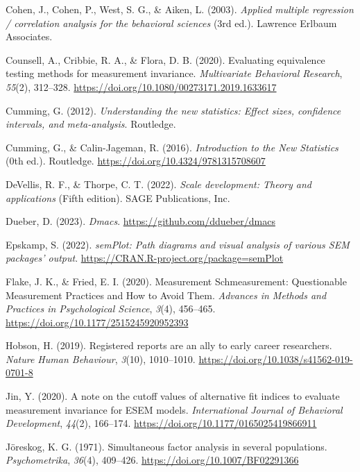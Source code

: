 \documentclass[
  man,floatsintext]{apa7}
\newlength{\cslhangindent}
\newenvironment{CSLReferences}[2] %
 {\begin{list}{}{%
  \setlength{\itemindent}{0pt}
  \setlength{\leftmargin}{0pt}
  \setlength{\parsep}{0pt}
  \ifodd #1
   \setlength{\leftmargin}{\cslhangindent}
   \setlength{\itemindent}{-1\cslhangindent}
  \fi
  \setlength{\itemsep}{#2\baselineskip}}}
 {\end{list}}
\begin{document}
\begin{CSLReferences}{1}{0}
Cohen, J., Cohen, P., West, S. G., \& Aiken, L. (2003). \emph{Applied multiple regression / correlation analysis for the behavioral sciences} (3rd ed.). Lawrence Erlbaum Associates.

Counsell, A., Cribbie, R. A., \& Flora, D. B. (2020). Evaluating equivalence testing methods for measurement invariance. \emph{Multivariate Behavioral Research}, \emph{55}(2), 312--328. \url{https://doi.org/10.1080/00273171.2019.1633617}

Cumming, G. (2012). \emph{Understanding the new statistics: Effect sizes, confidence intervals, and meta-analysis}. Routledge.

Cumming, G., \& Calin-Jageman, R. (2016). \emph{Introduction to the New Statistics} (0th ed.). Routledge. \url{https://doi.org/10.4324/9781315708607}

DeVellis, R. F., \& Thorpe, C. T. (2022). \emph{Scale development: Theory and applications} (Fifth edition). SAGE Publications, Inc.

Dueber, D. (2023). \emph{Dmacs}. \url{https://github.com/ddueber/dmacs}

Epskamp, S. (2022). \emph{semPlot: Path diagrams and visual analysis of various SEM packages' output}. \url{https://CRAN.R-project.org/package=semPlot}

Flake, J. K., \& Fried, E. I. (2020). Measurement Schmeasurement: Questionable Measurement Practices and How to Avoid Them. \emph{Advances in Methods and Practices in Psychological Science}, \emph{3}(4), 456--465. \url{https://doi.org/10.1177/2515245920952393}

Hobson, H. (2019). Registered reports are an ally to early career researchers. \emph{Nature Human Behaviour}, \emph{3}(10), 1010--1010. \url{https://doi.org/10.1038/s41562-019-0701-8}

Jin, Y. (2020). A note on the cutoff values of alternative fit indices to evaluate measurement invariance for ESEM models. \emph{International Journal of Behavioral Development}, \emph{44}(2), 166--174. \url{https://doi.org/10.1177/0165025419866911}

Jöreskog, K. G. (1971). Simultaneous factor analysis in several populations. \emph{Psychometrika}, \emph{36}(4), 409--426. \url{https://doi.org/10.1007/BF02291366}


\end{CSLReferences}
\end{document}
